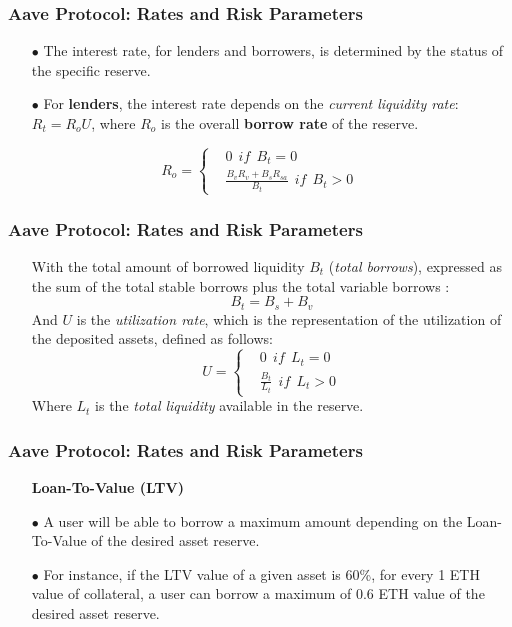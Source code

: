\documentclass{beamer}
\begin{document}
\begin{frame}	
	\frametitle{Aave Protocol: Rates and Risk Parameters}
	\begin{itemize}
		\item[$\bullet$] The interest rate, for lenders and borrowers, is determined by the status of the specific reserve.
		\item[$\bullet$] For \textbf{lenders}, the interest rate depends on  the \textit{current liquidity rate}: $ R_{t} = R_{o}U $, where $ R_{o} $ is the overall \textbf{borrow rate} of the reserve.
	\end{itemize}
\begin{equation}
	R_{o} = 
	\left\{\begin{matrix}
		&  0~~if~~B_{t}=0\\ 
		& \frac{B_{v}R_{v}+ B_{s}R_{sa}}{B_{t}}~~if~~B_{t} > 0
	\end{matrix}\right.
\end{equation}
\end{frame}

\begin{frame}	
	\frametitle{Aave Protocol: Rates and Risk Parameters}
	\begin{itemize}
		\item[] With the total amount of borrowed liquidity $B_{t} $ (\textit{total borrows}), expressed as the sum of the total stable borrows plus  the total variable borrows :
		\[ B_{t} = B_{s}+B_{v} \]
		And $ U $ is the \textit{utilization rate}, which is the representation of the utilization of the deposited assets, defined as follows:
		\begin{equation}
			U = 
			\left\{\begin{matrix}
				&  0~~if~~L_{t}=0\\ 
				& \frac{B_{t}}{L_{t}}~~if~~L_{t} > 0
			\end{matrix}\right.
		\end{equation}
		Where $L_{t}$  is the \textit{total liquidity} available in the reserve.
	\end{itemize}

\end{frame}

\begin{frame}	
	\frametitle{Aave Protocol: Rates and Risk Parameters}
	\begin{itemize}
		\item[] \textbf{Loan-To-Value (LTV)}
		\linebreak
		\item[$\bullet$] A user will be able to borrow a maximum amount depending on the Loan-To-Value of the desired asset reserve. 
		\item[$\bullet$] For instance, if the LTV value of a given asset is  60\%, for every 1 ETH value of collateral, a user can borrow a maximum of 0.6 ETH value of the desired asset reserve.
	\end{itemize}
	
\end{frame}
\end{document}
